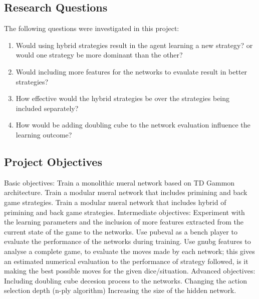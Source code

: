\documentclass[12pt,a4paper]{article}
\begin{document}
\subsection{Research Questions}
The following questions were investigated in this project:
\begin{enumerate}
    \item Would using hybrid strategies result in the agent learning a new strategy? or would one strategy be more dominant than the other?
    \item Would including more features for the networks to evaulate result in better strategies?
    \item How effective would the hybrid strategies be over the strategies being included separately?
    \item How would be adding doubling cube to the network evaluation influence the learning outcome?
\end{enumerate}

\subsection{Project Objectives}
Basic objectives: Train a monolithic nueral network based on TD Gammon architecture. Train a modular nueral network that includes primining and back game strategies. Train a modular nueral network that includes hybrid of primining and back game strategies. 
Intermediate objectives: Experiment with the learning parameters and the inclusion of more features extracted from the current state of the game to the networks. Use pubeval as a bench player to evaluate the performance of the networks during training. Use gnubg features to analyse a complete game, to evaluate the moves made by each network; this gives an estimated numerical evaluation to the performance of strategy followed, is it making the best possible moves for the given dice/situation. 
Advanced objectives: Including doubling cube decesion process to the networks. Changing the action selection depth (n-ply algorithm) Increasing the size of the hidden network. 

\end{document}
